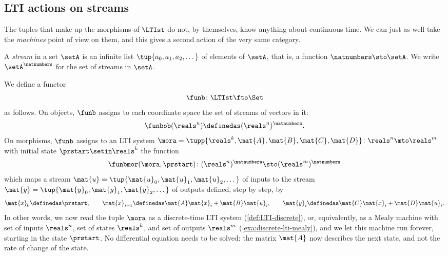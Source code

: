 \subsection{LTI actions on streams}

The tuples that make up the morphisms of $\LTIst$ do not, by themselves, know anything about continuous time.
We can just as well take the \emph{machines} point of view on them, and this gives a second action of the very same category.

\begin{example}
    \label{exa:lti-action-streams}
    A \emph{stream} in a set $\setA$ is an infinite list $\tup{a_0, a_1, a_2, \dots}$ of elements of $\setA$, that is, a function $\natnumbers \sto \setA$.
    We write $\setA^{\natnumbers}$ for the set of streams in $\setA$.

    We define a functor
    \begin{equation}
        \funb \colon \LTIst \fto \Set
    \end{equation}
    as follows.
    On objects, $\funb$ assigns to each coordinate space the set of streams of vectors in it:
    \begin{equation}
        \funbob(\reals^n) \definedas (\reals^n)^{\natnumbers}.
    \end{equation}
    On morphisms, $\funb$ assigns to an LTI system $\mora = \tupp{\reals^k, \mat{A}, \mat{B}, \mat{C}, \mat{D}} \colon \reals^n \mto \reals^m$ with initial state $\prstart \setin \reals^k$ the function
    \begin{equation}
        \funbmor(\mora, \prstart) \colon (\reals^n)^{\natnumbers} \sto (\reals^m)^{\natnumbers}
    \end{equation}
    which maps a stream $\mat{u} = \tup{\mat{u}_0, \mat{u}_1, \mat{u}_2, \dots}$ of inputs to the stream $\mat{y} = \tup{\mat{y}_0, \mat{y}_1, \mat{y}_2, \dots}$ of outputs defined, step by step, by
    \begin{equation}
        \label{eq:lti-action-streams}
        \mat{x}_0 \definedas \prstart,
        \qquad
        \mat{x}_{i+1} \definedas \mat{A}\mat{x}_i + \mat{B}\mat{u}_i,
        \qquad
        \mat{y}_i \definedas \mat{C}\mat{x}_i + \mat{D}\mat{u}_i.
    \end{equation}
    In other words, we now read the tuple $\mora$ as a discrete-time LTI system (\cref{def:LTI-discrete}), or, equivalently, as a Mealy machine with set of inputs $\reals^n$, set of states $\reals^k$, and set of outputs $\reals^m$ (\cref{exa:discrete-lti-mealy}), and we let this machine run forever, starting in the state $\prstart$.
    No differential equation needs to be solved: the matrix $\mat{A}$ now describes the next state, and not the rate of change of the state.


\end{example}
